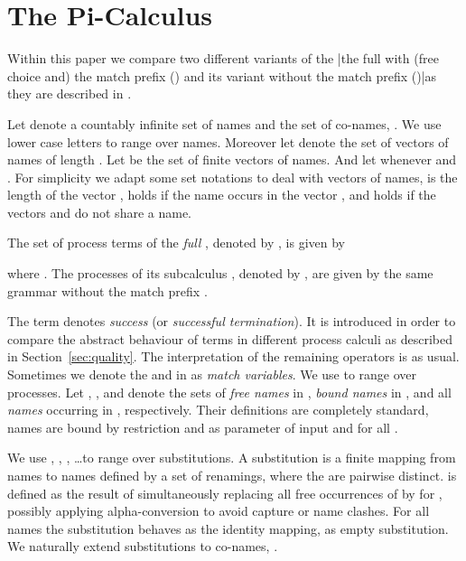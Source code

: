 \documentclass[final,copyright,creativecommons]{eptcs}
\begin{document}
\section{The Pi-Calculus}
\label{sec:processCalculi}

Within this paper we compare two different variants of the \piCal|the full \piCal with (free choice and) the match prefix (\piT) and its variant without the match prefix (\piNM)|as they are described \eg in \cite{milnerParrowWalker92,Milner1999}.

Let  denote a countably infinite set of names and  the set of co-names, \ie . We use lower case letters  to range over names.
Moreover let  denote the set of vectors of names of length . Let  be the set of finite vectors of names. And let  whenever  and .
For simplicity we adapt some set notations to deal with vectors of names, \eg  is the length of the vector ,  holds if the name  occurs in the vector , and  holds if the vectors  and  do not share a name.

\begin{definition}[Syntax]
	The set of process terms of the \emph{full \piCal}, denoted by , is given by
	
	
	\noindent
	where .
	The processes of its subcalculus \piNM, denoted by , are given by the same grammar without the match prefix .
\end{definition}

\noindent
The term  denotes \emph{success} (or \emph{successful termination}). It is introduced in order to compare the abstract behaviour of terms in different process calculi as described in Section~\ref{sec:quality}.
The interpretation of the remaining operators is as usual.
Sometimes we denote the  and  in  as \emph{match variables}.
We use  to range over processes. Let , , and  denote the sets of \emph{free names} in , \emph{bound names} in , and all \emph{names} occurring in , respectively. Their definitions are completely standard, \ie names are bound by restriction and as parameter of input and  for all .

We use , , , \ldots to range over substitutions. A substitution is a finite mapping from names to names defined by a set  of renamings, where the  are pairwise distinct.
 is defined as the result of simultaneously replacing all free occurrences of  by  for , possibly applying alpha-conversion to avoid capture or name clashes. For all names  the substitution behaves as the identity mapping, \ie as empty substitution.
We naturally extend substitutions to co-names, \ie .
\end{document}
